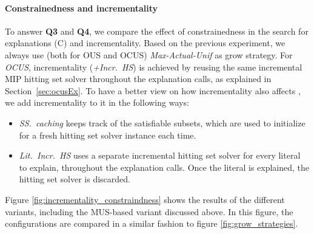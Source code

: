 \paragraph{Constrainedness and incrementality}
To answer \textbf{Q3} and \textbf{Q4}, we compare the effect of constrainedness in the search for explanations (C) and incrementality. Based on the previous experiment, we always use (both for OUS and OCUS) \emph{Max-Actual-Unif} as grow strategy.
For \emph{OCUS}, incrementality (\emph{+Incr.~HS}) is achieved by reusing the same incremental MIP hitting set solver throughout the explanation calls, as explained in Section~\ref{sec:ocusEx}.  
To have a better view on how incrementality also affects \omus, we add incrementality to it in the following ways:
\begin{itemize}
	\item \emph{SS.~caching} keeps track of the satisfiable subsets, which are used to initialize \setstohit for a fresh hitting set solver instance each time.
	\item \emph{Lit.~Incr.~HS} uses a separate incremental hitting set solver for every literal to explain, throughout the explanation calls. Once the literal is explained, the hitting set solver is discarded.
\end{itemize}
% 
Figure \ref{fig:incrementality_constraindness} shows the results of the different variants, including the MUS-based variant discussed above. 
In this figure, the configurations are compared in a similar fashion to figure \ref{fig:grow_strategies}.

